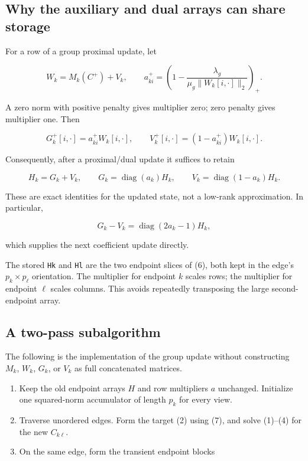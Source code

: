 \documentclass[
  11pt,
]{article}
\providecommand{\tightlist}{%
  \setlength{\itemsep}{0pt}\setlength{\parskip}{0pt}}
\begin{document}
\hypertarget{why-the-auxiliary-and-dual-arrays-can-share-storage}{%
\subsection{Why the auxiliary and dual arrays can share
storage}\label{why-the-auxiliary-and-dual-arrays-can-share-storage}}

For a row of a group proximal update, let

\[
W_k=M_k(C^{+})+V_k,\qquad
 a_{ki}^{+}=\left(1-\frac{\lambda_g}{\mu_g\|W_k[i,\cdot]\|_2}\right)_+.
\tag{5}
\]

A zero norm with positive penalty gives multiplier zero; zero penalty
gives multiplier one. Then

\[
G_k^{+}[i,\cdot]=a_{ki}^{+}W_k[i,\cdot],\qquad
V_k^{+}[i,\cdot]=(1-a_{ki}^{+})W_k[i,\cdot].
\]

Consequently, after a proximal/dual update it suffices to retain

\[
H_k=G_k+V_k,\qquad
G_k=\operatorname{diag}(a_k)H_k,\qquad
V_k=\operatorname{diag}(1-a_k)H_k.
\tag{6}
\]

These are exact identities for the updated state, not a low-rank
approximation. In particular,

\[
G_k-V_k=\operatorname{diag}(2a_k-1)H_k,
\tag{7}
\]

which supplies the next coefficient update directly.

The stored \texttt{Hk} and \texttt{Hl} are the two endpoint slices of
(6), both kept in the edge's \(p_k\times p_\ell\) orientation. The
multiplier for endpoint \(k\) scales rows; the multiplier for endpoint
\(\ell\) scales columns. This avoids repeatedly transposing the large
second-endpoint array.

\hypertarget{a-two-pass-subalgorithm}{%
\subsection{A two-pass subalgorithm}\label{a-two-pass-subalgorithm}}

The following is the implementation of the group update without
constructing \(M_k\), \(W_k\), \(G_k\), or \(V_k\) as full concatenated
matrices.

\begin{enumerate}
\def\labelenumi{\arabic{enumi}.}
\tightlist
\item
  Keep the old endpoint arrays \(H\) and row multipliers \(a\)
  unchanged. Initialize one squared-norm accumulator of length \(p_k\)
  for every view.
\item
  Traverse unordered edges. Form the target (2) using (7), and solve
  (1)--(4) for the new \(C_{k\ell}\).
\item
  On the same edge, form the transient endpoint blocks
\end{enumerate}
\end{document}

